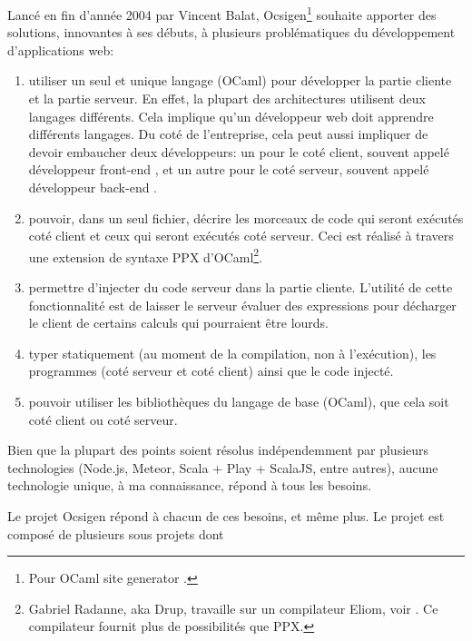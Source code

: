 Lancé en fin d'année 2004 par Vincent Balat, Ocsigen\footnote{Pour \og OCaml site
  generator \fg.} souhaite apporter des solutions, innovantes à ses débuts, à
plusieurs problématiques du développement d'applications web:

\begin{enumerate}
  \item utiliser un seul et unique langage (OCaml) pour développer la partie cliente et
    la partie serveur. En effet, la plupart des architectures utilisent deux
    langages différents. Cela implique qu'un développeur web doit apprendre différents
    langages. Du coté de l'entreprise, cela peut aussi impliquer de devoir
    embaucher deux développeurs: un pour le coté client, souvent appelé
    \og développeur front-end \fg, et un autre pour le coté serveur, souvent appelé
    \og développeur back-end \fg.
  \item pouvoir, dans un seul fichier, décrire les morceaux de code qui seront
exécutés coté client et ceux qui seront exécutés coté serveur. Ceci est réalisé
à travers une extension de syntaxe PPX d'OCaml\footnote{Gabriel Radanne, aka
  Drup, travaille sur un compilateur Eliom, voir
  \cite{ocsigen-eliomlang-github}. Ce compilateur fournit plus de possibilités
  que PPX.}.
  \item permettre d'injecter du code serveur dans la partie cliente.
    L'utilité de cette fonctionnalité est de laisser le serveur évaluer
des expressions pour décharger le client de certains calculs qui pourraient être
lourds.
  \item typer statiquement (au moment de la compilation, non à l'exécution), les
    programmes (coté serveur et coté client) ainsi que le code injecté.
  \item pouvoir utiliser les bibliothèques du langage de base (OCaml), que cela
    soit coté client ou coté serveur.
\end{enumerate}

Bien que la plupart des points soient résolus indépendemment par plusieurs
technologies (Node.js\cite{nodejs-website}, Meteor\cite{meteor-website},
Scala\cite{scala-website} + Play\cite{play-website} +
ScalaJS\cite{scalajs-website}, entre autres), aucune technologie unique, à ma
connaissance, répond à tous les besoins.

Le projet Ocsigen répond à chacun de ces besoins, et même plus. Le projet est
composé de plusieurs sous projets dont

